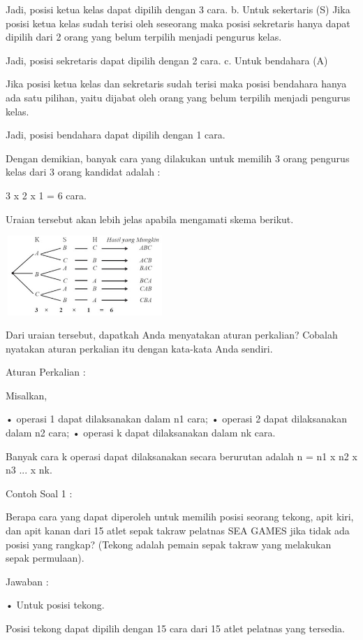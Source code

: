 \documentclass[11pt,fleqn]{book} %
\begin{document}
 Jadi, posisi ketua kelas dapat dipilih dengan 3 cara.
b. Untuk sekertaris (S)
 Jika posisi ketua kelas sudah terisi oleh seseorang maka  posisi sekretaris hanya dapat dipilih dari 2 orang yang belum terpilih menjadi pengurus kelas. 

 Jadi, posisi sekretaris dapat dipilih dengan 2 cara.
c. Untuk bendahara (A)
 
Jika posisi ketua kelas dan sekretaris sudah terisi maka posisi bendahara hanya ada satu pilihan, yaitu dijabat oleh orang yang belum terpilih menjadi pengurus kelas.

Jadi, posisi bendahara dapat dipilih dengan 1 cara.

Dengan demikian, banyak cara yang dilakukan untuk memilih 3 orang pengurus kelas dari 3 orang kandidat adalah :

3 x 2 x 1 = 6 cara.

Uraian tersebut akan lebih jelas apabila mengamati skema berikut.


\includegraphics[width = 6cm, height= 3cm]{Pictures/gen2.png}

Dari uraian tersebut, dapatkah Anda menyatakan aturan perkalian? Cobalah nyatakan aturan perkalian itu dengan kata-kata Anda sendiri.

Aturan Perkalian :

Misalkan,

• operasi 1 dapat dilaksanakan dalam n1 cara;
• operasi 2 dapat dilaksanakan dalam n2 cara;
• operasi k dapat dilaksanakan dalam nk cara.

Banyak cara k operasi dapat dilaksanakan secara berurutan adalah n = n1 x n2 x n3 ... x nk.

Contoh Soal 1 :

Berapa cara yang dapat diperoleh untuk memilih posisi seorang tekong, apit kiri, dan apit kanan dari 15 atlet sepak takraw pelatnas SEA GAMES jika tidak ada posisi yang rangkap? (Tekong adalah pemain sepak takraw yang melakukan sepak permulaan).

Jawaban :

• Untuk posisi tekong.

Posisi tekong dapat dipilih dengan 15 cara dari 15 atlet pelatnas yang tersedia.
\end{document}
